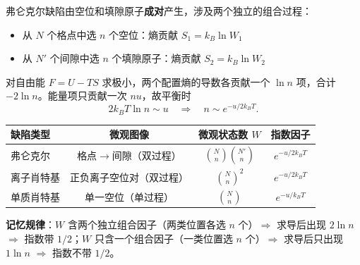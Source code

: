 \begin{insightbox}
弗仑克尔缺陷由空位和填隙原子\textbf{成对}产生，涉及两个独立的组合过程：
\begin{itemize}
    \item 从 $N$ 个格点中选 $n$ 个空位：熵贡献 $S_1 = k_{\!B}\ln W_1$
    \item 从 $N'$ 个间隙中选 $n$ 个填隙原子：熵贡献 $S_2 = k_{\!B}\ln W_2$
\end{itemize}
对自由能 $F = U - TS$ 求极小，两个配置熵的导数各贡献一个 $\ln n$ 项，合计 $-2\ln n$。能量项只贡献一次 $nu$，故平衡时
\[
2k_{\!B}T\ln n \sim u \quad\Longrightarrow\quad n\sim e^{-u/2k_{\!B}T}.
\]
\begin{center}
\begin{tabular}{lccc}
\toprule
\textbf{缺陷类型} & \textbf{微观图像} & \textbf{微观状态数 $W$} & \textbf{指数因子} \\
\midrule
弗仑克尔 & 格点$\to$间隙（双过程） & $\displaystyle\binom{N}{n}\binom{N'}{n}$ & $e^{-u/2k_{\!B}T}$ \\
离子肖特基 & 正负离子空位对（双过程） & $\displaystyle\binom{N}{n}^2$ & $e^{-u/2k_{\!B}T}$ \\
单质肖特基 & 单一空位（单过程） & $\displaystyle\binom{N}{n}$ & $e^{-u/k_{\!B}T}$ \\
\bottomrule
\end{tabular}
\end{center}
\vspace{4pt}
\textbf{记忆规律}：$W$ 含两个独立组合因子（两类位置各选 $n$ 个）$\Rightarrow$ 求导后出现 $2\ln n$ $\Rightarrow$ 指数带 $1/2$；$W$ 只含一个组合因子（一类位置选 $n$ 个）$\Rightarrow$ 求导后只出现 $1\ln n$ $\Rightarrow$ 指数不带 $1/2$。
\end{insightbox}


